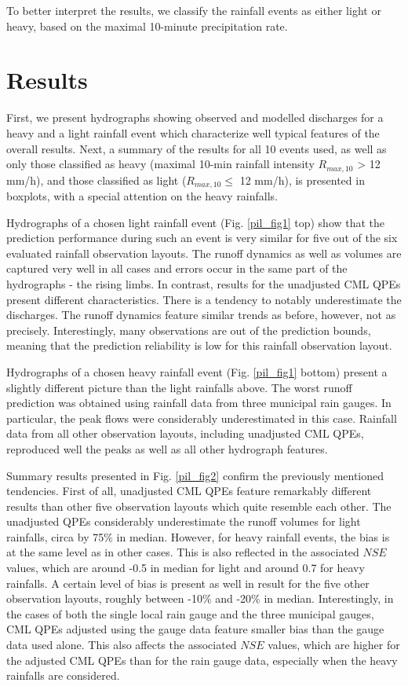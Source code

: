 \documentclass{ctuthesis}\usepackage[]{graphicx}\usepackage[]{color}
\begin{document}
To better interpret the results, we classify the rainfall events as either light or heavy, based on the maximal 10-minute precipitation rate. 



\section{Results}

First, we present hydrographs showing observed and modelled discharges for a heavy and a light rainfall event which characterize well typical features of the overall results. Next, a summary of the results for all 10 events used, as well as only those classified as heavy (maximal 10-min rainfall intensity $R_{max,10}$ > 12 mm/h), and those classified as light ($R_{max,10} \leq$ 12 mm/h), is presented in  boxplots, with a special attention on the heavy rainfalls.

Hydrographs of a chosen light rainfall event (Fig. \ref{pil_fig1} top) show that the prediction performance during such an event is very similar for five out of the six evaluated rainfall observation layouts. The runoff dynamics as well as volumes are captured very well in all cases and errors occur in the same part of the hydrographs -  the  rising limbs. In contrast, results for the unadjusted CML QPEs present different characteristics. There is a tendency to notably underestimate the discharges. The runoff dynamics feature similar trends as before, however, not as precisely. Interestingly, many observations are out of the prediction bounds, meaning that the prediction reliability is low for this rainfall observation layout.

Hydrographs of a chosen heavy rainfall event (Fig. \ref{pil_fig1} bottom) present a slightly different picture than the light rainfalls above. The worst runoff prediction was obtained using rainfall data from three municipal rain gauges. In particular, the peak flows were considerably underestimated in this case. Rainfall data from all other observation layouts, including unadjusted CML QPEs, reproduced well the peaks as well as all other hydrograph features.

Summary results presented in Fig. \ref{pil_fig2} confirm the previously mentioned tendencies. First of all, unadjusted CML QPEs feature remarkably different results than other five observation layouts which quite resemble each other. The unadjusted QPEs considerably underestimate the runoff volumes for light rainfalls, circa by 75\% in median. However, for heavy rainfall events, the bias is at the same level as in other cases. This is also reflected in the associated $N\!S\!E$ values, which are around -0.5 in median for light and around 0.7 for heavy rainfalls. A certain level of bias is present as well in result for the five other observation layouts, roughly between -10\% and -20\% in median. Interestingly, in the cases of both the single local rain gauge and the three municipal gauges, CML QPEs adjusted using the gauge data feature smaller bias than the gauge data used alone. This also affects the associated $N\!S\!E$ values, which are higher for the adjusted CML QPEs than for the rain gauge data, especially when the heavy rainfalls are considered.
\end{document}
